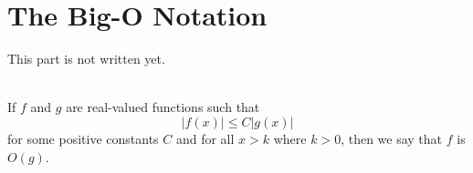 \chapter{The Big-O Notation} \label{chap:bigOnotation}

This part is not written yet. \\

\td \\

\begin{definition}
    If $f$ and $g$ are real-valued functions such that
    $$|f(x)| \leq C|g(x)|$$
    for some positive constants $C$ and for all $x > k$ where $k > 0$, then we say that $f$ is $O(g)$. 
\end{definition}